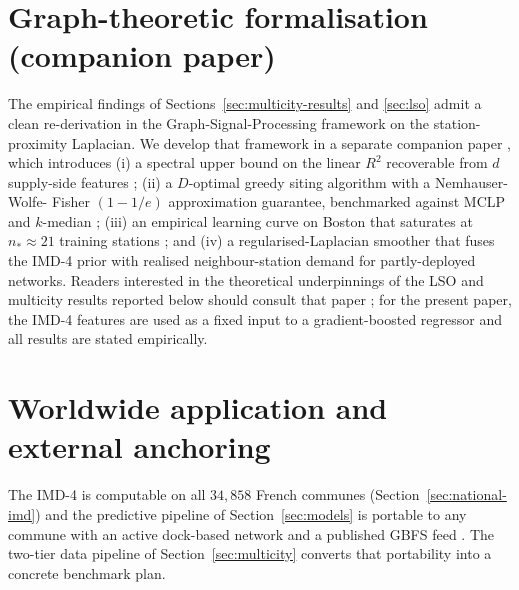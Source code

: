 \documentclass[11pt,a4paper]{article}
\begin{document}
\section{Graph-theoretic formalisation (companion paper)}
\label{sec:gsp-companion}

The empirical findings of
Sections~\ref{sec:multicity-results} and \ref{sec:lso} admit a
clean re-derivation in the Graph-Signal-Processing framework on
the station-proximity Laplacian.  We develop that framework in
a separate companion paper \citep{FossePallares2026gsp}, which
introduces (i) a spectral upper bound on the linear $R^2$
recoverable from $d$ supply-side features ; (ii) a
$D$-optimal greedy siting algorithm with a Nemhauser-Wolfe-
Fisher $(1{-}1/e)$ approximation guarantee, benchmarked against
MCLP and $k$-median ; (iii) an empirical learning curve on
Boston that saturates at $n_* \approx 21$ training stations ; and
(iv) a regularised-Laplacian smoother that fuses the IMD-4 prior
with realised neighbour-station demand for partly-deployed
networks.  Readers interested in the theoretical underpinnings
of the LSO and multicity results reported below should consult
that paper ; for the present paper, the IMD-4 features are used
as a fixed input to a gradient-boosted regressor and all
results are stated empirically.
\section{Worldwide application and external anchoring}
\label{sec:future}

The IMD-4 is computable on all $34{,}858$ French communes
(Section~\ref{sec:national-imd}) and the predictive pipeline of
Section~\ref{sec:models} is portable to any commune with an
active dock-based network and a published GBFS feed
\citep{Fosse2026gold}.  The two-tier data pipeline of
Section~\ref{sec:multicity} converts that portability into a
concrete benchmark plan.
\end{document}

